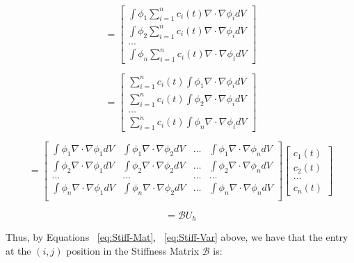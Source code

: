 \begin{equation}
= \begin{bmatrix}
\int \phi_1 \sum\limits_{i=1}^n c_i(t) \nabla \cdot \nabla \phi_i dV \\
\int \phi_2 \sum\limits_{i=1}^n c_i(t) \nabla \cdot \nabla \phi_i dV \\
\ldots \\
\int \phi_n \sum\limits_{i=1}^n c_i(t) \nabla \cdot \nabla \phi_i dV
\end{bmatrix}
\end{equation}

\begin{equation}
= \begin{bmatrix}
\sum\limits_{i=1}^n c_i(t) \int \phi_1 \nabla \cdot \nabla \phi_i dV \\
\sum\limits_{i=1}^n c_i(t) \int \phi_2 \nabla \cdot \nabla \phi_i dV \\
\ldots \\
\sum\limits_{i=1}^n c_i(t) \int \phi_n \nabla \cdot \nabla \phi_i dV
\end{bmatrix}
\end{equation}

\begin{equation}
\label{eq:Stiff-Mat}
= \begin{bmatrix}
\int \phi_1 \nabla \cdot \nabla \phi_1 dV & \int \phi_1 \nabla \cdot \nabla \phi_2 dV & \ldots & \int \phi_1 \nabla \cdot \nabla \phi_n dV \\
\int \phi_2 \nabla \cdot \nabla \phi_1 dV & \int \phi_2 \nabla \cdot \nabla \phi_2 dV & \ldots & \int \phi_2 \nabla \cdot \nabla \phi_n dV \\
\ldots & \ldots & \ldots & \ldots \\
\int \phi_n \nabla \cdot \nabla \phi_1 dV & \int \phi_n \nabla \cdot \nabla \phi_2 dV & \ldots & \int \phi_n \nabla \cdot \nabla \phi_n dV \\
\end{bmatrix} 
\begin{bmatrix}
c_1(t) \\
c_2(t) \\
\ldots \\
c_n(t)
\end{bmatrix}
\end{equation}

\begin{equation}
\label{eq:Stiff-Var}
= \mathcal{B} U_h
\end{equation}

Thus, by Equations ~\ref{eq:Stiff-Mat}, ~\ref{eq:Stiff-Var} above, we have that the entry at the $(i,j)$ position in the Stiffness Matrix $\mathcal{B}$ is:

